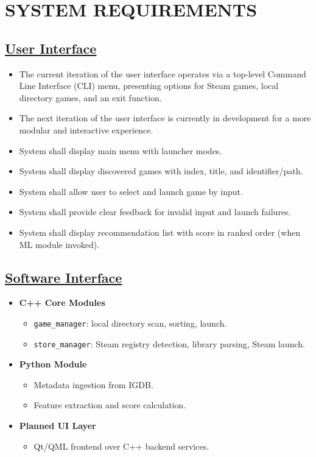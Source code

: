 \section{SYSTEM REQUIREMENTS}

\subsection{\underline{User Interface}}
\begin{itemize}
    \item The current iteration of the user interface operates via a top-level Command Line Interface (CLI) menu, presenting options for Steam games, local directory games, and an exit function.
    \item The next iteration of the user interface is currently in development for a more modular and interactive experience.
    \item System shall display main menu with launcher modes.
    \item System shall display discovered games with index, title, and identifier/path.
    \item System shall allow user to select and launch game by input.
    \item System shall provide clear feedback for invalid input and launch failures.
    \item System shall display recommendation list with score in ranked order (when ML module invoked).
\end{itemize}

\subsection{\underline{Software Interface}}
\begin{itemize}

\item \textbf{C++ Core Modules}
    \begin{itemize}
	\item \texttt{game\_manager}: local directory scan, sorting, launch.
	\item \texttt{store\_manager}: Steam registry detection, library parsing, Steam launch.
    \end{itemize}

\item \textbf{Python Module}
    \begin{itemize}
	\item Metadata ingestion from IGDB.
	\item Feature extraction and score calculation.
    \end{itemize}

\item \textbf{Planned UI Layer}
    \begin{itemize}
	\item Qt/QML frontend over C++ backend services.
    \end{itemize}

\end{itemize}

